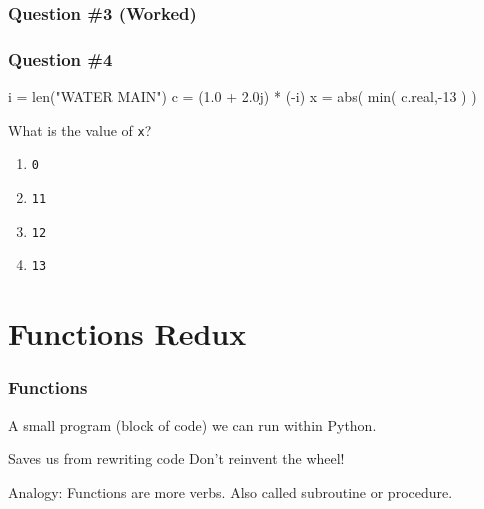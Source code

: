 \documentclass[11pt]{beamer}
\begin{document}
\begin{frame}[fragile]
  \frametitle{Question \#3 (Worked)}
  \Enlarge

\end{frame}

\begin{frame}[fragile]
  \frametitle{Question \#4}
  \Enlarge

  \begin{semiverbatim}
i = len("WATER MAIN")
c = (1.0 + 2.0j) * (-i)
x = abs( min( c.real,-13 ) )
  \end{semiverbatim}
  What is the value of \texttt{x}?
  \begin{enumerate}[label=\Alph*]
  \item  \texttt{0}
  \item  \texttt{11}
  \item  \texttt{12}
  \item  \texttt{13}
  \end{enumerate}
\end{frame}

\section{Functions Redux}

\begin{frame}
  \frametitle{Functions}
  \Enlarge

  \begin{itemize}
  \myitem  A small program (block of code) we can run within Python.
    \begin{itemize}
    \mysubitem  Saves us from rewriting code
    \mysubitem  Don't reinvent the wheel!
    \end{itemize}
  \myitem  Analogy:  Functions are more verbs.
  \myitem  Also called subroutine or procedure.
  \end{itemize}
\end{frame}
\end{document}
